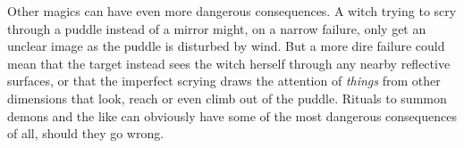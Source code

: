 Other magics can have even more dangerous consequences.
A witch trying to scry through a puddle instead of a mirror might, on a narrow failure, only get an unclear image as the puddle is disturbed by wind.
But a more dire failure could mean that the target instead sees the witch herself through any nearby reflective surfaces, or that the imperfect scrying draws the attention of \emph{things} from other dimensions that look, reach or even climb out of the puddle.
Rituals to summon demons and the like can obviously have some of the most dangerous consequences of all, should they go wrong.
